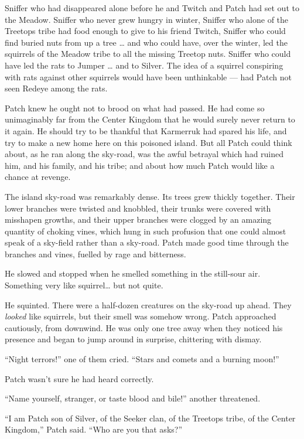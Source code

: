 \documentclass[ebook,oneside,openany,12pt]{memoir}
\begin{document}
Sniffer who had disappeared alone before he and Twitch and Patch had
set out to the Meadow. Sniffer who never grew hungry in winter,
Sniffer who alone of the Treetops tribe had food enough to give to his
friend Twitch, Sniffer who could find buried nuts from up a tree … and
who could have, over the winter, led the squirrels of the Meadow tribe
to all the missing Treetop nuts. Sniffer who could have led the rats
to Jumper … and to Silver. The idea of a squirrel conspiring with rats
against other squirrels would have been unthinkable — had Patch not
seen Redeye among the rats.

Patch knew he ought not to brood on what had passed. He had come so
unimaginably far from the Center Kingdom that he would surely never
return to it again. He should try to be thankful that Karmerruk had
spared his life, and try to make a new home here on this poisoned
island. But all Patch could think about, as he ran along the sky-road,
was the awful betrayal which had ruined him, and his family, and his
tribe; and about how much Patch would like a chance at revenge.

The island sky-road was remarkably dense. Its trees grew thickly
together. Their lower branches were twisted and knobbled, their trunks
were covered with misshapen growths, and their upper branches were
clogged by an amazing quantity of choking vines, which hung in such
profusion that one could almost speak of a sky-field rather than a
sky-road. Patch made good time through the branches and vines, fuelled
by rage and bitterness.

He slowed and stopped when he smelled something in the still-sour
air. Something very like squirrel… but not quite.

He squinted. There were a half-dozen creatures on the sky-road up
ahead. They \emph{looked} like squirrels, but their smell was
somehow wrong. Patch approached cautiously, from downwind. He was only
one tree away when they noticed his presence and began to jump around
in surprise, chittering with dismay.

“Night terrors!” one of them cried. “Stars and comets and a burning
moon!”

Patch wasn’t sure he had heard correctly.

“Name yourself, stranger, or taste blood and bile!” another
threatened.

“I am Patch son of Silver, of the Seeker clan, of the Treetops tribe,
of the Center Kingdom,” Patch said. “Who are you that asks?”
\end{document}
